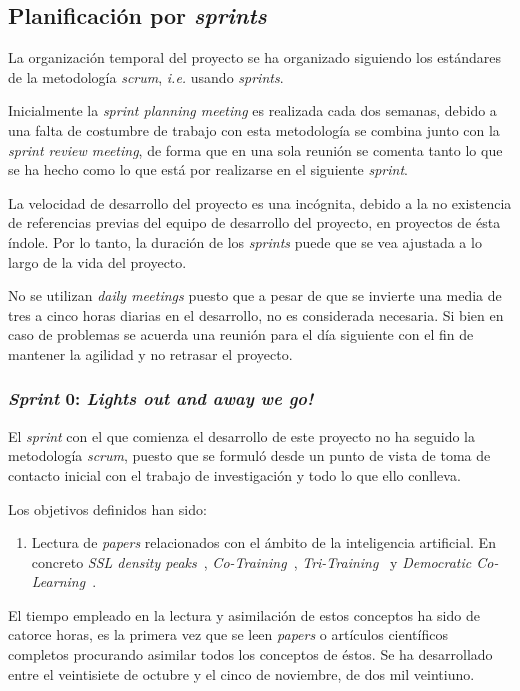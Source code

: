 \subsection{Planificación por \textit{sprints}}
La organización temporal del proyecto se ha organizado siguiendo los estándares de la metodología \textit{scrum}, \textit{i.e.} usando \textit{sprints}. 

Inicialmente la \textit{sprint planning meeting} es realizada cada dos semanas, debido a una falta de costumbre de trabajo con esta metodología se combina junto con la \textit{sprint review meeting}, de forma que en una sola reunión se comenta tanto lo que se ha hecho como lo que está por realizarse en el siguiente \textit{sprint}.

La velocidad de desarrollo del proyecto es una incógnita, debido a la no existencia de referencias previas del equipo de desarrollo del proyecto, en proyectos de ésta índole. Por lo tanto, la duración de los \textit{sprints} puede que se vea ajustada a lo largo de la vida del proyecto.

No se utilizan \textit{daily meetings} puesto que a pesar de que se invierte una media de tres a cinco horas diarias en el desarrollo, no es considerada necesaria. Si bien en caso de problemas se acuerda una reunión para el día siguiente con el fin de mantener la agilidad y no retrasar el proyecto.

\subsubsection{\textit{Sprint} 0: \textit{Lights out and away we go!} }
El \textit{sprint} con el que comienza el desarrollo de este proyecto no ha seguido la metodología \textit{scrum}, puesto que se formuló desde un punto de vista de toma de contacto inicial con el trabajo de investigación y todo lo que ello conlleva.

Los objetivos definidos han sido:
\begin{enumerate}
\item Lectura de \textit{papers} relacionados con el ámbito de la inteligencia artificial. En concreto \textit{SSL density peaks}~\cite{wu2018self}, \textit{Co-Training}~\cite{blum1998combining}, \textit{Tri-Training}~\cite{zhou2005tri} y \textit{Democratic Co-Learning}~\cite{zhou2004democratic}.
\end{enumerate}

El tiempo empleado en la lectura y asimilación de estos conceptos ha sido de catorce horas, es la primera vez que se leen \textit{papers} o artículos científicos completos procurando asimilar todos los conceptos de éstos. Se ha desarrollado entre el veintisiete de octubre y el cinco de noviembre, de dos mil veintiuno. 

